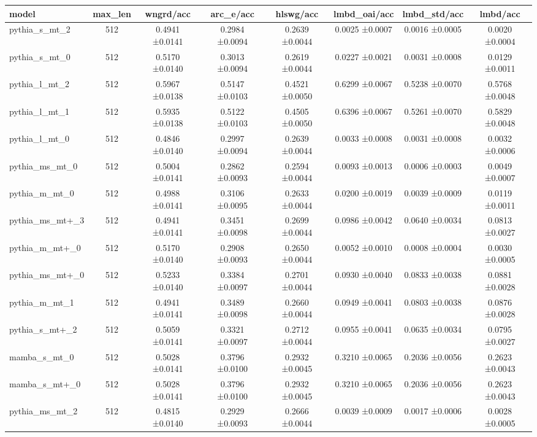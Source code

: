 \begin{tabular}{lccccccc}
\toprule
model & max\_len & wngrd/acc & arc\_e/acc & hlswg/acc & lmbd\_oai/acc & lmbd\_std/acc & lmbd/acc \\
\midrule
pythia\_s\_mt\_2 & 512 & 0.4941 ±0.0141 & 0.2984 ±0.0094 & 0.2639 ±0.0044 & 0.0025 ±0.0007 & 0.0016 ±0.0005 & 0.0020 ±0.0004 \\
pythia\_s\_mt\_0 & 512 & 0.5170 ±0.0140 & 0.3013 ±0.0094 & 0.2619 ±0.0044 & 0.0227 ±0.0021 & 0.0031 ±0.0008 & 0.0129 ±0.0011 \\
pythia\_l\_mt\_2 & 512 & 0.5967 ±0.0138 & 0.5147 ±0.0103 & 0.4521 ±0.0050 & 0.6299 ±0.0067 & 0.5238 ±0.0070 & 0.5768 ±0.0048 \\
pythia\_l\_mt\_1 & 512 & 0.5935 ±0.0138 & 0.5122 ±0.0103 & 0.4505 ±0.0050 & 0.6396 ±0.0067 & 0.5261 ±0.0070 & 0.5829 ±0.0048 \\
pythia\_l\_mt\_0 & 512 & 0.4846 ±0.0140 & 0.2997 ±0.0094 & 0.2639 ±0.0044 & 0.0033 ±0.0008 & 0.0031 ±0.0008 & 0.0032 ±0.0006 \\
pythia\_ms\_mt\_0 & 512 & 0.5004 ±0.0141 & 0.2862 ±0.0093 & 0.2594 ±0.0044 & 0.0093 ±0.0013 & 0.0006 ±0.0003 & 0.0049 ±0.0007 \\
pythia\_m\_mt\_0 & 512 & 0.4988 ±0.0141 & 0.3106 ±0.0095 & 0.2633 ±0.0044 & 0.0200 ±0.0019 & 0.0039 ±0.0009 & 0.0119 ±0.0011 \\
pythia\_ms\_mt+\_3 & 512 & 0.4941 ±0.0141 & 0.3451 ±0.0098 & 0.2699 ±0.0044 & 0.0986 ±0.0042 & 0.0640 ±0.0034 & 0.0813 ±0.0027 \\
pythia\_m\_mt+\_0 & 512 & 0.5170 ±0.0140 & 0.2908 ±0.0093 & 0.2650 ±0.0044 & 0.0052 ±0.0010 & 0.0008 ±0.0004 & 0.0030 ±0.0005 \\
pythia\_ms\_mt+\_0 & 512 & 0.5233 ±0.0140 & 0.3384 ±0.0097 & 0.2701 ±0.0044 & 0.0930 ±0.0040 & 0.0833 ±0.0038 & 0.0881 ±0.0028 \\
pythia\_m\_mt\_1 & 512 & 0.4941 ±0.0141 & 0.3489 ±0.0098 & 0.2660 ±0.0044 & 0.0949 ±0.0041 & 0.0803 ±0.0038 & 0.0876 ±0.0028 \\
pythia\_s\_mt+\_2 & 512 & 0.5059 ±0.0141 & 0.3321 ±0.0097 & 0.2712 ±0.0044 & 0.0955 ±0.0041 & 0.0635 ±0.0034 & 0.0795 ±0.0027 \\
mamba\_s\_mt\_0 & 512 & 0.5028 ±0.0141 & 0.3796 ±0.0100 & 0.2932 ±0.0045 & 0.3210 ±0.0065 & 0.2036 ±0.0056 & 0.2623 ±0.0043 \\
mamba\_s\_mt+\_0 & 512 & 0.5028 ±0.0141 & 0.3796 ±0.0100 & 0.2932 ±0.0045 & 0.3210 ±0.0065 & 0.2036 ±0.0056 & 0.2623 ±0.0043 \\
pythia\_ms\_mt\_2 & 512 & 0.4815 ±0.0140 & 0.2929 ±0.0093 & 0.2666 ±0.0044 & 0.0039 ±0.0009 & 0.0017 ±0.0006 & 0.0028 ±0.0005 \\

\end{tabular}
